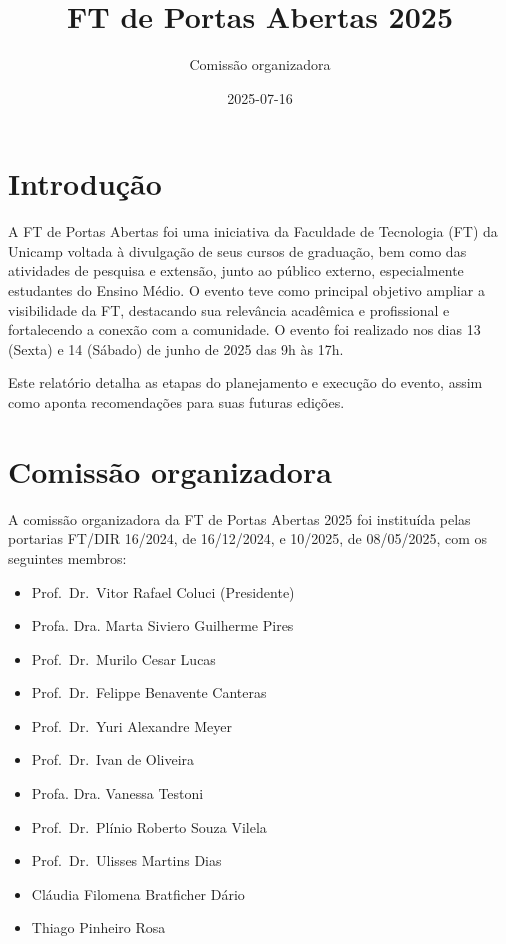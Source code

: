 \documentclass[
  letterpaper,
  DIV=11,
  numbers=noendperiod]{scrreprt}
\title{FT de Portas Abertas 2025}
\author{Comissão organizadora}
\date{2025-07-16}
\renewcommand*\contentsname{Table of contents}
\newcommand\contentsname{Table of contents}
\begin{document}
\maketitle

\renewcommand*\contentsname{Table of contents}
{
\hypersetup{linkcolor=}
\setcounter{tocdepth}{2}
\tableofcontents
}


\chapter{Introdução}\label{introduuxe7uxe3o}

A FT de Portas Abertas foi uma iniciativa da Faculdade de Tecnologia
(FT) da Unicamp voltada à divulgação de seus cursos de graduação, bem
como das atividades de pesquisa e extensão, junto ao público externo,
especialmente estudantes do Ensino Médio. O evento teve como principal
objetivo ampliar a visibilidade da FT, destacando sua relevância
acadêmica e profissional e fortalecendo a conexão com a comunidade. O
evento foi realizado nos dias 13 (Sexta) e 14 (Sábado) de junho de 2025
das 9h às 17h.

Este relatório detalha as etapas do planejamento e execução do evento,
assim como aponta recomendações para suas futuras edições.


\chapter{Comissão organizadora}\label{comissuxe3o-organizadora}

A comissão organizadora da FT de Portas Abertas 2025 foi instituída
pelas portarias FT/DIR 16/2024, de 16/12/2024, e 10/2025, de 08/05/2025,
com os seguintes membros:

\begin{itemize}
\item
  Prof.~Dr.~Vitor Rafael Coluci (Presidente)
\item
  Profa. Dra. Marta Siviero Guilherme Pires
\item
  Prof.~Dr.~Murilo Cesar Lucas
\item
  Prof.~Dr.~Felippe Benavente Canteras
\item
  Prof.~Dr.~Yuri Alexandre Meyer
\item
  Prof.~Dr.~Ivan de Oliveira
\item
  Profa. Dra. Vanessa Testoni
\item
  Prof.~Dr.~Plínio Roberto Souza Vilela
\item
  Prof.~Dr.~Ulisses Martins Dias
\item
  Cláudia Filomena Bratficher Dário
\item
  Thiago Pinheiro Rosa
\end{itemize}
\end{document}
